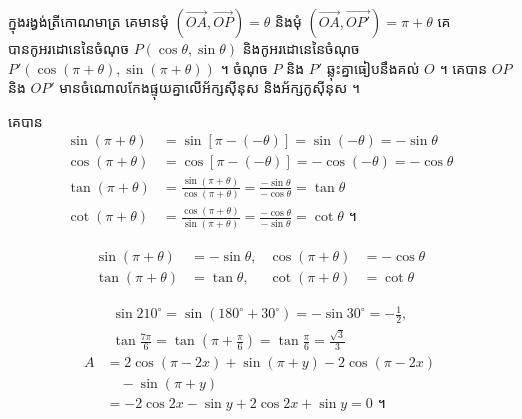 ក្នុងរង្វង់ត្រីកោណមាត្រ គេមានមុំ $(\overrightarrow{OA}, \overrightarrow{OP}) = \theta$ និងមុំ $(\overrightarrow{OA}, \overrightarrow{OP'}) = \pi + \theta$ គេបានកូអរដោនេនៃចំណុច $P(\cos\theta, \sin\theta)$ និងកូអរដោនេនៃចំណុច $P'(\cos(\pi + \theta), \sin(\pi + \theta))$ ។ ចំណុច $P$ និង $P'$ ឆ្លុះគ្នាធៀបនឹងគល់ $O$ ។ គេបាន $OP$ និង $OP'$ មានចំណោលកែងផ្ទុយគ្នាលើអ័ក្សស៊ីនុស និងអ័ក្សកូស៊ីនុស ។
\begin{center}
\end{center}
គេបាន
\[
\begin{aligned}
\sin(\pi + \theta) &= \sin[\pi - (-\theta)] = \sin(-\theta) = -\sin\theta\\
\cos(\pi + \theta) &= \cos[\pi - (-\theta)] = -\cos(-\theta) = -\cos\theta\\
\tan(\pi + \theta) &= \frac{\sin(\pi + \theta)}{\cos(\pi + \theta)} = \frac{-\sin\theta}{-\cos\theta} = \tan\theta\\
\cot(\pi + \theta) &= \frac{\cos(\pi + \theta)}{\sin(\pi + \theta)} = \frac{-\cos\theta}{-\sin\theta} = \cot\theta \text{ ។}
\end{aligned}
\]
\begin{formulaBox}[គេបានរូបមន្ត]
\[
\begin{aligned}
\sin(\pi + \theta) &= -\sin\theta, & \cos(\pi + \theta) &= -\cos\theta\\
\tan(\pi + \theta) &= \tan\theta, & \cot(\pi + \theta) &= \cot\theta
\end{aligned}
\]
\end{formulaBox}
\begin{example}[ឧទាហរណ៍]
\[
\begin{gathered}
\sin 210^\circ = \sin(180^\circ + 30^\circ) = -\sin 30^\circ = -\frac{1}{2},\\
\tan\frac{7\pi}{6} = \tan\left(\pi + \frac{\pi}{6}\right) = \tan\frac{\pi}{6} = \frac{\sqrt{3}}{3}
\end{gathered}
\]
\[
\begin{aligned}
A &= 2\cos(\pi - 2x) + \sin(\pi + y) - 2\cos(\pi - 2x)\\
&\quad - \sin(\pi + y)\\
&= -2\cos 2x - \sin y + 2\cos 2x + \sin y = 0 \text{ ។}
\end{aligned}
\]
\end{example}

